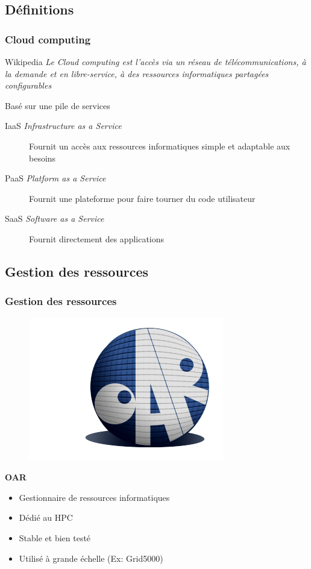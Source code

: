 \documentclass{beamer}
\begin{document}
		\subsection{Définitions}
			\begin{frame}
			  \frametitle{Cloud computing}
			    \begin{block}{Wikipedia}
			      \textit{Le Cloud computing est l'accès via un réseau de télécommunications, à la demande et en libre-service, à des ressources informatiques partagées configurables}
			    \end{block}
			    Basé sur une pile de services
			    \begin{description}
			      \item[IaaS \textit{Infrastructure as a Service}] 
			      Fournit un accès aux ressources informatiques simple et adaptable aux besoins
			      \item[PaaS \textit{Platform as a Service}]
			      Fournit une plateforme pour faire tourner du code utilisateur
			      \item[SaaS \textit{Software as a Service}]
			      Fournit directement des applications
			    \end{description}
			\end{frame}
			
		\subsection{Gestion des ressources}
			\begin{frame}
				\frametitle{Gestion des ressources}
				\begin{figure}
			    \includegraphics[scale=0.3]{img/logo_oar.png}
 			  \end{figure}
 			  \textbf{OAR}
 			  \begin{itemize}
   			  \item Gestionnaire de ressources informatiques
   			  \item Dédié au HPC
   			  \item Stable et bien testé
   			  \item Utilisé à grande échelle (Ex: Grid5000)
 			  \end{itemize}
			\end{frame}
	
\end{document}
